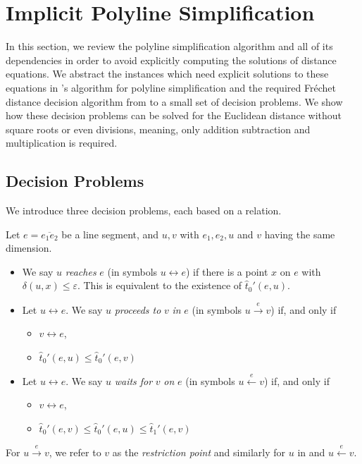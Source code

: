 \section{Implicit Polyline Simplification}\label{sec:implicit_polyline_simplification} 
In this section, we review the polyline simplification algorithm and all of its dependencies in order to avoid explicitly computing the solutions of distance equations. We abstract the instances which need explicit solutions to these equations in \citeauthor{on_optimal_polyline_simplification_using_the_hausdorff_and_frechet_distance}'s algorithm for polyline simplification and the required Fréchet distance decision algorithm from \citeauthor{computing_the_frechet_distance_between_two_polygonal_curves} to a small set of decision problems. 
We show how these decision problems can be solved for the Euclidean distance without square roots or even divisions, meaning, only addition subtraction and multiplication is required. 

\subsection{Decision Problems}
We introduce three decision problems, each based on a relation. 
\begin{definition}\label{def:implicit_relations}
  Let \(e = \overline{e_1e_2}\) be a line segment, and \(u, v\) with \(e_1, e_2, u\) and \(v\) having the same dimension. 
  \begin{itemize}
    \item We say \(u\) \emph{reaches} \(e\) (in symbols \(u \leftrightarrow e\)) if there is a point \(x\) on \(e\) with \(\delta(u,x)\leq \varepsilon\). This is equivalent to the existence of \(\hat t_0'(e, u)\).
    \item Let \(u \leftrightarrow e\). We say \(u\) \emph{proceeds to} \(v\) \emph{in} \(e\) (in symbols \(u \overset{e}\rightarrow v\)) if, and only if 
      \begin{itemize}
        \item \(v \leftrightarrow e\), 
        \item \(\hat t_0'(e, u) \leq \hat t_0'(e, v)\)
      \end{itemize}

    \item Let \(u \leftrightarrow e\). We say \(u\) \emph{waits for} \(v\) \emph{on} \(e\) (in symbols \(u \overset{e}\leftarrow v\)) if, and only if
      \begin{itemize}
        \item \(v \leftrightarrow e\), 
        \item \(\hat t_0'(e, v) \leq \hat t_0'(e, u) \leq \hat t_1'(e, v)\)
      \end{itemize}
  \end{itemize}
  For \(u \overset e\rightarrow v\), we refer to \(v\) as the \emph{restriction point} and similarly for \(u\) in and \(u \overset e\leftarrow v\).
\end{definition}

